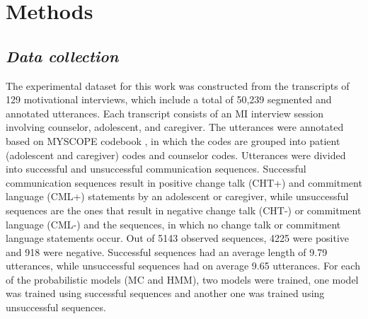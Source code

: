 \documentclass{amia_summit_2018}
\begin{document}
\section*{Methods}
\subsection*{\textit{Data collection}}
The experimental dataset for this work was constructed from the transcripts of 129 motivational interviews, which include a total of 50,239 segmented and annotated utterances. Each transcript consists
of an MI interview session involving counselor, adolescent, and caregiver. The utterances were annotated based on MYSCOPE codebook \cite{carcone2013provider}, in which the codes are grouped into
patient (adolescent and caregiver) codes and counselor codes. Utterances were divided into successful and unsuccessful communication sequences. Successful communication sequences result in
positive change talk (CHT+) and commitment language (CML+) statements by an adolescent or caregiver, while unsuccessful sequences are the ones that result in negative change talk (CHT-) or commitment language (CML-) and the
sequences, in which no change talk or commitment language statements occur. Out of 5143 observed sequences, 4225 were positive and 918 were negative. Successful sequences had an average length of
9.79 utterances, while unsuccessful sequences had on average 9.65 utterances. For each of the probabilistic models (MC and HMM), two models were trained, one model was trained using successful
sequences and another one was trained using unsuccessful sequences. 

%
\end{document}
